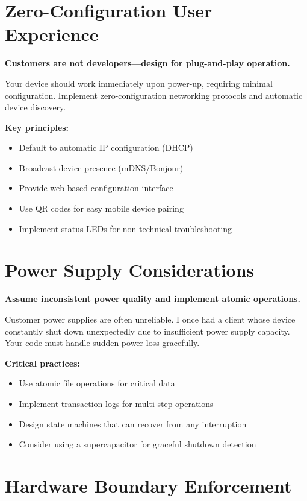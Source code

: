 \section{Zero-Configuration User Experience}

\textbf{Customers are not developers—design for plug-and-play operation.}

Your device should work immediately upon power-up, requiring minimal configuration. Implement zero-configuration networking protocols and automatic device discovery.

\textbf{Key principles:}
\begin{itemize}
\item Default to automatic IP configuration (DHCP)
\item Broadcast device presence (mDNS/Bonjour)
\item Provide web-based configuration interface
\item Use QR codes for easy mobile device pairing
\item Implement status LEDs for non-technical troubleshooting
\end{itemize}

\section{Power Supply Considerations}

\textbf{Assume inconsistent power quality and implement atomic operations.}

Customer power supplies are often unreliable. I once had a client whose device constantly shut down unexpectedly due to insufficient power supply capacity. Your code must handle sudden power loss gracefully.

\textbf{Critical practices:}
\begin{itemize}
\item Use atomic file operations for critical data
\item Implement transaction logs for multi-step operations
\item Design state machines that can recover from any interruption
\item Consider using a supercapacitor for graceful shutdown detection
\end{itemize}

\section{Hardware Boundary Enforcement}

